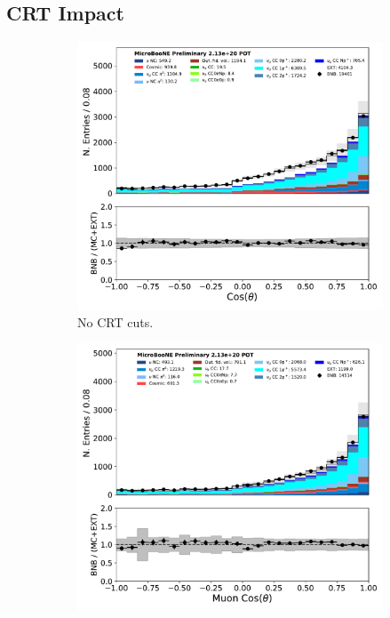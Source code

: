 \subsection{CRT Impact}
\label{ssec:Appendix:numu:CRTimpact}
\begin{figure}[H] 
\begin{center}
    \begin{subfigure}[b]{0.35\textwidth}
        \centering
        \includegraphics[width=1.00\textwidth]{NuMuCCsel/Images/Ryan/Run3_nocrt/trk_cos_theta_08052020_fullsel_samples_event_category_noCRT.pdf}
        \caption{No CRT cuts.}
        \label{fig:NuMUCCsel:ryan:run3_costheta_withCRT}
    \end{subfigure}
    \begin{subfigure}[b]{0.35\textwidth}
        \centering
        \includegraphics[width=1.00\textwidth]{NuMuCCsel/Images/Ryan/fullselection_run3_fullsystematics/trk_cos_theta_v_07232020_fullsel_samples_detsys_event_category.pdf}

\end{subfigure}
\end{center}
\end{figure}

